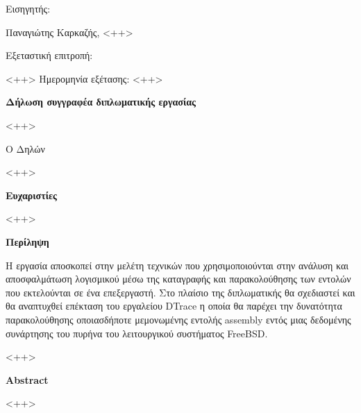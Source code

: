 \documentclass[12pt]{article}
\begin{document}
Εισηγητής:

\begin{center}
Παναγιώτης Καρκαζής, <++> %
\end{center}

Εξεταστική επιτροπή:

\begin{center}
<++>
\linebreak
\linebreak
Ημερομηνία εξέτασης: <++>
\end{center}

\pagebreak
\shipout\null

\begin{center}
\textbf{Δήλωση συγγραφέα διπλωματικής εργασίας}
\end{center}

<++>

\begin{center}
Ο Δηλών

<++> %
\end{center}

\pagebreak
\shipout\null

\begin{center}
\textbf{Ευχαριστίες}
\end{center}


<++>

\pagebreak
\shipout\null

\begin{center}
\textbf{Περίληψη}
\end{center}

Η εργασία αποσκοπεί στην μελέτη τεχνικών που χρησιμοποιούνται στην ανάλυση και
αποσφαλμάτωση λογισμικού μέσω της καταγραφής και παρακολούθησης των εντολών που
εκτελούνται σε ένα επεξεργαστή. Στο πλαίσιο της διπλωματικής θα σχεδιαστεί και
θα αναπτυχθεί επέκταση του εργαλείου DTrace η οποία θα παρέχει την δυνατότητα
παρακολούθησης οποιασδήποτε μεμονωμένης εντολής assembly εντός μιας δεδομένης
συνάρτησης του πυρήνα του λειτουργικού συστήματος FreeBSD.

<++> %

\begin{center}
\textbf{Abstract}
\end{center}

<++>

\pagebreak

\renewcommand{\contentsname}{Περιεχόμενα}
\tableofcontents
\pagebreak
\end{document}
